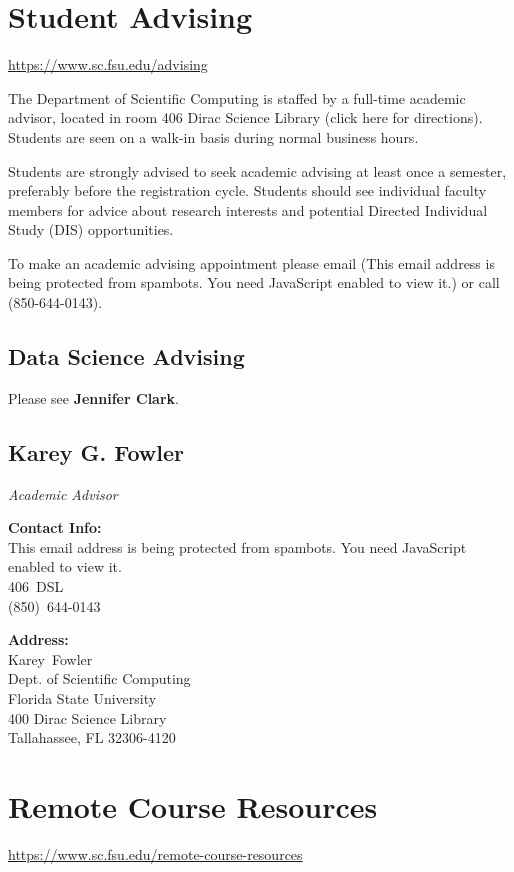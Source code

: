 \documentclass[12pt,a4paper]{article}
\begin{document}
\section{Student Advising}
\url{https://www.sc.fsu.edu/advising}

The Department of Scientific Computing is staffed by a full-time academic advisor, located in room 406 Dirac Science Library (click here for directions). Students are seen on a walk-in basis during normal business hours.

Students are strongly advised to seek academic advising at least once a semester, preferably before the registration cycle. Students should see individual faculty members for advice about research interests and potential Directed Individual Study (DIS) opportunities.

To make an academic advising appointment please email (This email address is being protected from spambots. You need JavaScript enabled to view it.) or call (850-644-0143).

\subsection*{Data Science Advising}
Please see \textbf{Jennifer Clark}.

\subsection*{Karey G. Fowler}
\textit{Academic Advisor}
\vspace{1em}

\textbf{Contact Info:} \\
This email address is being protected from spambots. You need JavaScript enabled to view it. \\
406~DSL \\
(850)~644-0143
\vspace{1em}

\textbf{Address:} \\
Karey~Fowler \\
Dept. of Scientific Computing \\
Florida State University \\
400 Dirac Science Library \\
Tallahassee, FL 32306-4120

\section{Remote Course Resources}
\url{https://www.sc.fsu.edu/remote-course-resources}
\end{document}
